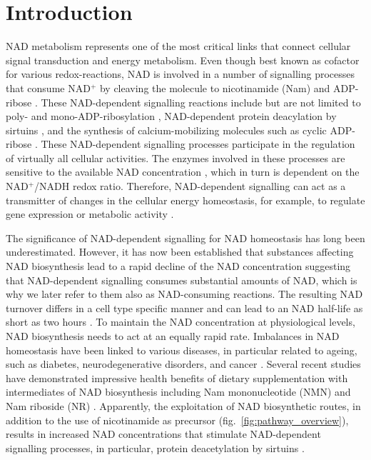 
\section{Introduction}

NAD metabolism represents one of the most critical links that connect cellular signal transduction and energy metabolism. Even though best known as cofactor for various redox-reactions, NAD is involved in a number of signalling processes that consume NAD$^{+}$ by cleaving the molecule to nicotinamide (Nam) and ADP-ribose \cite{Verdin2015}. These NAD-dependent signalling reactions include but are not limited to poly- and mono-ADP-ribosylation \cite{Butepage2015,DeVos2012}, NAD-dependent protein deacylation by sirtuins \cite{Osborne2016}, and the synthesis of calcium-mobilizing molecules such as cyclic ADP-ribose \cite{Lee2012}. These NAD-dependent signalling processes participate in the regulation of virtually all cellular activities. The enzymes involved in these processes are sensitive to the available NAD concentration \cite{Ruggieri2015}, which in turn is dependent on the NAD$^{+}$/NADH redox ratio. Therefore, NAD-dependent signalling can act as a transmitter of changes in the cellular energy homeostasis, for example, to regulate gene expression or metabolic activity \cite{Koch-Nolte2009}.

The significance of NAD-dependent signalling for NAD homeostasis has long been underestimated. However, it has now been established that substances affecting NAD biosynthesis lead to a rapid decline of the NAD concentration \cite{Buonvicino2018} suggesting that NAD-dependent signalling consumes substantial amounts of NAD, which is why we later refer to them also as NAD-consuming reactions. The resulting NAD turnover differs in a cell type specific manner and can lead to an NAD half-life as short as two hours \cite{Liu2018}. To maintain the NAD concentration at physiological levels, NAD biosynthesis needs to act at an equally rapid rate. Imbalances in NAD homeostasis have been linked to various diseases, in particular related to ageing, such as diabetes, neurodegenerative disorders, and cancer \cite{Chiarugi2012,Verdin2015}. Several recent studies have demonstrated impressive health benefits of dietary supplementation with intermediates of NAD biosynthesis including Nam mononucleotide (NMN) and Nam riboside (NR) \cite{Yoshino2018}. Apparently, the exploitation of NAD biosynthetic routes, in addition to the use of nicotinamide as precursor (fig.~\ref{fig:pathway_overview}), results in increased NAD concentrations that stimulate NAD-dependent signalling processes, in particular, protein deacetylation by sirtuins \cite{North2004}.

